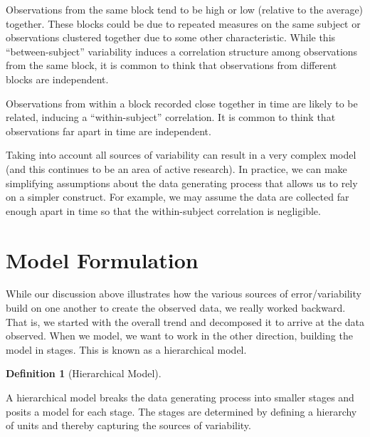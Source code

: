 \documentclass[
  letterpaper,
  DIV=11,
  numbers=noendperiod]{scrreprt}
\theoremstyle{definition}
\theoremstyle{definition}
\newtheorem{definition}{Definition}[chapter]
\theoremstyle{remark}
\begin{document}
\begin{tcolorbox}[enhanced jigsaw, bottomrule=.15mm, titlerule=0mm, bottomtitle=1mm, colback=white, coltitle=black, rightrule=.15mm, leftrule=.75mm, toprule=.15mm, toptitle=1mm, left=2mm, opacityback=0, colframe=quarto-callout-tip-color-frame, breakable, title=\textcolor{quarto-callout-tip-color}{\faLightbulb}\hspace{0.5em}{Big Idea}, arc=.35mm, colbacktitle=quarto-callout-tip-color!10!white, opacitybacktitle=0.6]

Observations from the same block tend to be high or low (relative to the
average) together. These blocks could be due to repeated measures on the
same subject or observations clustered together due to some other
characteristic. While this ``between-subject'' variability induces a
correlation structure among observations from the same block, it is
common to think that observations from different blocks are independent.

Observations from within a block recorded close together in time are
likely to be related, inducing a ``within-subject'' correlation. It is
common to think that observations far apart in time are independent.

\end{tcolorbox}

Taking into account all sources of variability can result in a very
complex model (and this continues to be an area of active research). In
practice, we can make simplifying assumptions about the data generating
process that allows us to rely on a simpler construct. For example, we
may assume the data are collected far enough apart in time so that the
within-subject correlation is negligible.

\hypertarget{model-formulation}{%
\section{Model Formulation}\label{model-formulation}}

While our discussion above illustrates how the various sources of
error/variability build on one another to create the observed data, we
really worked backward. That is, we started with the overall trend and
decomposed it to arrive at the data observed. When we model, we want to
work in the other direction, building the model in stages. This is known
as a hierarchical model.

\begin{definition}[Hierarchical
Model]\protect\hypertarget{def-hierarchical-model}{}\label{def-hierarchical-model}

A hierarchical model breaks the data generating process into smaller
stages and posits a model for each stage. The stages are determined by
defining a hierarchy of units and thereby capturing the sources of
variability.

\end{definition}
\end{document}
